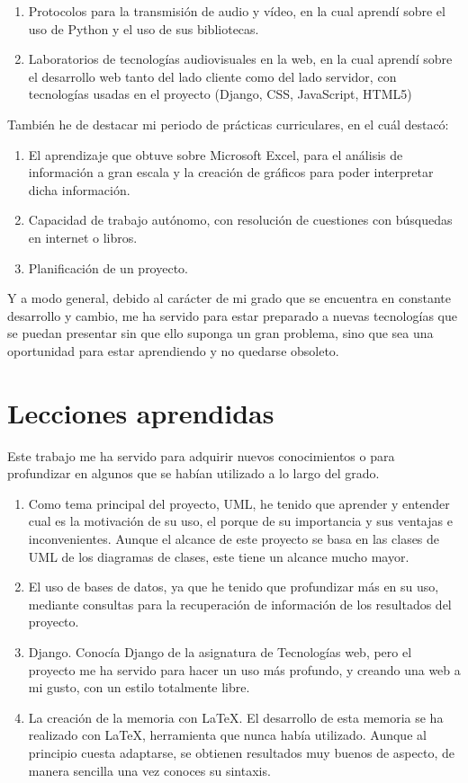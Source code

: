 \documentclass[a4paper, 12pt]{book}
\begin{document}
\begin{enumerate}
  \item Protocolos para la transmisión de audio y vídeo, en la cual aprendí sobre el uso de Python y el uso de sus bibliotecas.
  \item Laboratorios de tecnologías audiovisuales en la web, en la cual aprendí sobre el desarrollo web tanto del lado cliente
  como del lado servidor, con tecnologías usadas en el proyecto (Django, CSS, JavaScript, HTML5)
\end{enumerate}

También he de destacar mi periodo de prácticas curriculares, en el cuál destacó:
\begin{enumerate}
  \item El aprendizaje que obtuve sobre Microsoft Excel, para el análisis de información a gran escala y la creación de gráficos
  para poder interpretar dicha información.
  \item Capacidad de trabajo autónomo, con resolución de cuestiones con búsquedas en internet o libros.
  \item Planificación de un proyecto.
\end{enumerate}

Y a modo general, debido al carácter de mi grado que se encuentra en constante desarrollo y cambio, me ha servido para estar
preparado a nuevas tecnologías que se puedan presentar sin que ello suponga un gran problema, sino que sea una oportunidad para
estar aprendiendo y no quedarse obsoleto.


\section{Lecciones aprendidas}
\label{sec:lecciones_aprendidas}

Este trabajo me ha servido para adquirir nuevos conocimientos o para profundizar en algunos que se habían utilizado a lo largo del grado.

\begin{enumerate}
  \item Como tema principal del proyecto, UML, he tenido que aprender y entender cual es la motivación de su uso,
  el porque de su importancia y sus ventajas e inconvenientes.
  Aunque el alcance de este proyecto se basa en las clases de UML de los diagramas de clases, este tiene un alcance mucho mayor.
  \item El uso de bases de datos, ya que he tenido que profundizar más en su uso, mediante consultas para la recuperación de información
  de los resultados del proyecto.
  \item Django. Conocía Django de la asignatura de Tecnologías web, pero el proyecto me ha servido para hacer un uso más profundo,
  y creando una web a mi gusto, con un estilo totalmente libre.
  \item La creación de la memoria con \LaTeX{}. El desarrollo de esta memoria se ha realizado con \LaTeX{}, herramienta que nunca había
  utilizado. Aunque al principio cuesta adaptarse, se obtienen resultados muy buenos de aspecto, de manera sencilla una vez conoces su sintaxis.
\end{enumerate}
\end{document}
